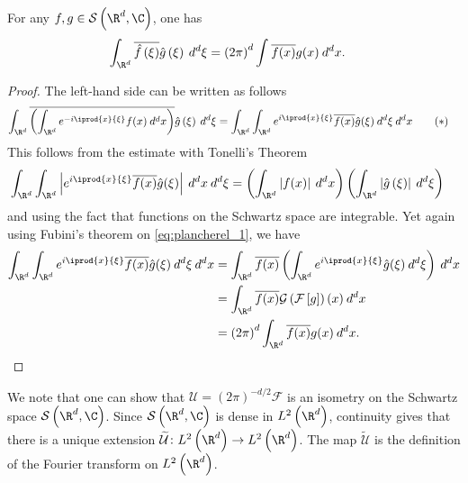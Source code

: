 \documentclass[10pt]{mypackage}
\begin{document}
\begin{theorem}
  For any $f,g\in \mathcal{S}\left( \R^d,\C \right)$, one has
  \begin{align*}
    \int_{\R^d}^{} \overline{\hat{f}\left( \xi \right)} \hat{g}\left( \xi \right)\:d^{d}\xi &= \left( 2\pi \right)^{d} \int_{}^{} \overline{f(x)}g(x)\:d^{d}x.
  \end{align*}
\end{theorem}
\begin{proof}
  The left-hand side can be written as follows
  \begin{align*}
    \int_{\R^d}^{} \overline{\left( \int_{\R^d}^{} e^{-i \iprod{x}{\xi}} f(x)\:d^{d}x \right)} \hat{g}\left( \xi \right)\:d^{d}\xi &= \int_{\R^d}^{} \int_{\R^d}^{} e^{i \iprod{x}{\xi}} \overline{f(x)}\hat{g}(\xi)\:d^{d}\xi\:d^{d}x \label{eq:plancherel_1}\tag{$\ast$}
  \end{align*}
  This follows from the estimate with Tonelli's Theorem
  \begin{align*}
    \int_{\R^d}^{} \int_{\R^d}^{} \left\vert e^{i \iprod{x}{\xi}} \overline{f(x)} \hat{g}(\xi) \right\vert\:d^{d}x\:d^{d}\xi &= \left( \int_{\R^d}^{} \left\vert f(x) \right\vert\:d^{d}x \right) \left( \int_{\R^d}^{} \left\vert \hat{g}\left( \xi \right) \right\vert\:d^{d}\xi \right)
  \end{align*}
  and using the fact that functions on the Schwartz space are integrable. Yet again using Fubini's theorem on \eqref{eq:plancherel_1}, we have
  \begin{align*}
    \int_{\R^d}^{} \int_{\R^d}^{} e^{i \iprod{x}{\xi}} \overline{f(x)}\hat{g}(\xi)\:d^{d}\xi\:d^{d}x &= \int_{\R^d}^{} \overline{f(x)} \left( \int_{\R^d}^{} e^{i \iprod{x}{\xi}}\hat{g}(\xi)\:d^{d}\xi \right)\:d^{d}x\\
             &= \int_{\R^d}^{} \overline{f(x)} \mathcal{G}\left( \mathcal{F}\left[ g \right] \right)(x)\:d^{d}x\\
             &= \left( 2\pi \right)^{d} \int_{\R^d}^{} \overline{f(x)} g(x)\:d^{d}x.
  \end{align*}
\end{proof}
We note that one can show that $\mathcal{U} = \left( 2\pi \right)^{-d/2} \mathcal{F}$ is an isometry on the Schwartz space $\mathcal{S}\left( \R^d,\C \right)$. Since $\mathcal{S}\left( \R^d,\C \right)$ is dense in $L^2\left( \R^d \right)$, continuity gives that there is a unique extension $ \widetilde{ \mathcal{U} }\colon L^2\left( \R^d \right)\rightarrow L^2\left( \R^d \right) $. The map $ \widetilde{ \mathcal{U} } $ is the definition of the Fourier transform on $L^2\left( \R^d \right)$.
\end{document}
